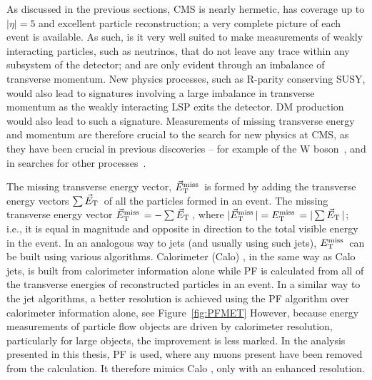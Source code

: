 As discussed in the previous sections, \ac{CMS} is nearly hermetic, has coverage up to $|\eta| = 5$ and excellent particle reconstruction; a very complete picture of each event is available. 
As such, is it very well suited to make measurements of weakly interacting particles, such as neutrinos, that do not leave any trace within any subsystem of the detector; and are only evident through an imbalance of transverse momentum.
New physics processes, such as R-parity conserving \ac{SUSY}, would also lead to signatures involving a large imbalance in transverse momentum as the weakly interacting \ac{LSP} exits the detector. \ac{DM} production would also lead to such a signature.
Measurements of missing transverse energy and momentum are therefore crucial to the search for new physics at \ac{CMS}, as they have been crucial in previous discoveries -- for example of the W boson~\cite{bib:Wdiscovery}, and in searches for other processes~\cite{Albajar:173124,Albajar:173125}. 

The missing transverse energy vector, $\vec{E}_{\text{T}}^{\text{miss}}\,$ is formed by adding the transverse energy vectors $\sum \vec{E}_{\text{T}}\,$ of all the particles formed in an event. The missing transverse energy vector $\vec{E}_{\text{T}}^{\text{miss}}\, = - \sum \vec{E}_{\text{T}}\,$, where $|\vec{E}_{\text{T}}^{\text{miss}}\,| = E_{\text{T}}^{\text{miss}}\, = |\sum \vec{E}_{\text{T}}\,|$; i.e., it is equal in magnitude and opposite in direction to the total visible energy in the event.
In an analogous way to jets (and usually using such jets), $E_{\text{T}}^{\text{miss}}\,$ can be built using various algorithms. 
Calorimeter (Calo) \MET, in the same way as Calo jets, is built from calorimeter information alone while
\ac{PF} \MET is calculated from all of the transverse energies of reconstructed particles in an event. 
In a similar way to the jet algorithms, a better resolution is achieved using the \ac{PF} algorithm over calorimeter information alone, see Figure~\ref{fig:PFMET}
However, because energy measurements of particle flow objects are driven by calorimeter resolution, particularly for large \ET objects, the improvement is less marked.
In the analysis presented in this thesis, \ac{PF} \MET is used, where any muons present have been removed from the  calculation. It therefore mimics Calo \MET, only with an enhanced resolution. 

